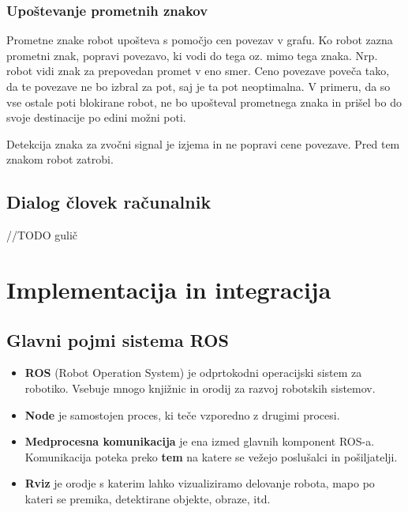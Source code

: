 \documentclass[a4paper,11pt]{article}
\begin{document}
\subsubsection{Upoštevanje prometnih znakov}

Prometne znake robot upošteva s pomočjo cen povezav v grafu. Ko robot zazna prometni znak, popravi povezavo, ki vodi do tega oz. mimo tega znaka. Nrp. robot vidi znak za prepovedan promet v eno smer. Ceno povezave poveča tako, da te povezave ne bo izbral za pot, saj je ta pot neoptimalna. V primeru, da so vse ostale poti blokirane robot, ne bo upošteval prometnega znaka in prišel bo do svoje destinacije po edini možni poti.

Detekcija znaka za zvočni signal je izjema in ne popravi cene povezave. Pred tem znakom robot zatrobi.

\subsection{Dialog človek računalnik}

//TODO gulič


\section{Implementacija in integracija}

\subsection{Glavni pojmi sistema ROS}

\begin{itemize}
\item \textbf{ROS} (Robot Operation System) je odprtokodni operacijski sistem za robotiko. Vsebuje mnogo knjižnic in orodij za razvoj robotskih sistemov.
\item \textbf{Node} je samostojen proces, ki teče vzporedno z drugimi procesi.
\item \textbf{Medprocesna komunikacija} je ena izmed glavnih komponent ROS-a. Komunikacija poteka preko \textbf{tem} na katere se vežejo poslušalci in pošiljatelji. 
\item \textbf{Rviz} je orodje s katerim lahko vizualiziramo delovanje robota, mapo po kateri se premika, detektirane objekte, obraze, itd.
\end{itemize}
\end{document}
